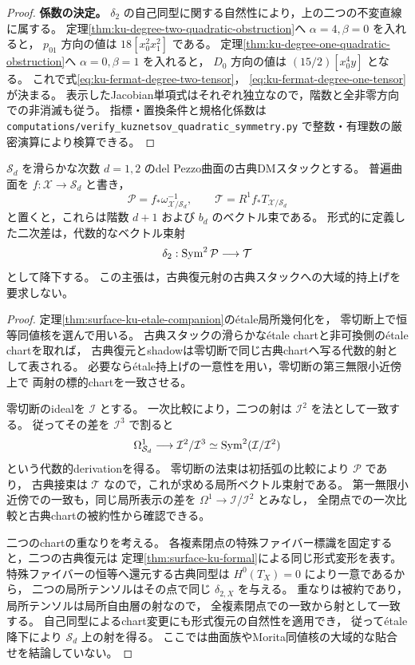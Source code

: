 \begin{proof}
\textbf{係数の決定。}
$\delta_2$ の自己同型に関する自然性により，上の二つの不変直線に属する。
定理\ref{thm:ku-degree-two-quadratic-obstruction}へ $\alpha=4,\beta=0$ を入れると，
$p_{01}$ 方向の値は $18[x_0^2x_1^2]$ である。
定理\ref{thm:ku-degree-one-quadratic-obstruction}へ $\alpha=0,\beta=1$ を入れると，
$D_0$ 方向の値は $(15/2)[x_0^4y]$ となる。
これで式\eqref{eq:ku-fermat-degree-two-tensor}，
\eqref{eq:ku-fermat-degree-one-tensor}が決まる。
表示したJacobian単項式はそれぞれ独立なので，階数と全非零方向での非消滅も従う。
指標・置換条件と規格化係数は
\texttt{computations/verify\_kuznetsov\_quadratic\_symmetry.py}
で整数・有理数の厳密演算により検算できる。
\end{proof}

\begin{lemma}[二次差の代数性]
\label{lem:ku-quadratic-algebraic-tensor}
$\mathcal S_d$ を滑らかな次数 $d=1,2$ のdel Pezzo曲面の古典DMスタックとする。
普遍曲面を $f:\mathcal X\to\mathcal S_d$ と書き，
\[
 \mathcal P=f_*\omega_{\mathcal X/\mathcal S_d}^{-1},
 \qquad \mathcal T=R^1f_*T_{\mathcal X/\mathcal S_d}
\]
と置くと，これらは階数 $d+1$ および $b_d$ のベクトル束である。
形式的に定義した二次差は，代数的なベクトル束射
\[
 \delta_2:\operatorname{Sym}^2\mathcal P\longrightarrow\mathcal T
\]
として降下する。
この主張は，古典復元射の古典スタックへの大域的持上げを要求しない。
\end{lemma}
\begin{proof}
定理\ref{thm:surface-ku-etale-companion}のétale局所幾何化を，
零切断上で恒等同値核を選んで用いる。
古典スタックの滑らかなétale chartと非可換側のétale chartを取れば，
古典復元とshadowは零切断で同じ古典chartへ写る代数的射として表される。
必要ならétale持上げの一意性を用い，零切断の第三無限小近傍上で
両射の標的chartを一致させる。

零切断のidealを $\mathcal I$ とする。
一次比較により，二つの射は $\mathcal I^2$ を法として一致する。
従ってその差を $\mathcal I^3$ で割ると
\[
 \Omega^1_{\mathcal S_d}
 \longrightarrow\mathcal I^2/\mathcal I^3
 \simeq\operatorname{Sym}^2(\mathcal I/\mathcal I^2)
\]
という代数的derivationを得る。
零切断の法束は初括弧の比較により $\mathcal P$ であり，
古典接束は $\mathcal T$ なので，これが求める局所ベクトル束射である。
第一無限小近傍での一致も，同じ局所表示の差を
$\Omega^1\to\mathcal I/\mathcal I^2$ とみなし，
全閉点での一次比較と古典chartの被約性から確認できる。

二つのchartの重なりを考える。
各複素閉点の特殊ファイバー標識を固定すると，二つの古典復元は
定理\ref{thm:surface-ku-formal}による同じ形式変形を表す。
特殊ファイバーの恒等へ還元する古典同型は $H^0(T_X)=0$ により一意であるから，
二つの局所テンソルはその点で同じ $\delta_{2,X}$ を与える。
重なりは被約であり，局所テンソルは局所自由層の射なので，
全複素閉点での一致から射として一致する。
自己同型によるchart変更にも形式復元の自然性を適用でき，
従ってétale降下により $\mathcal S_d$ 上の射を得る。
ここでは曲面族やMorita同値核の大域的な貼合せを結論していない。
\end{proof}

